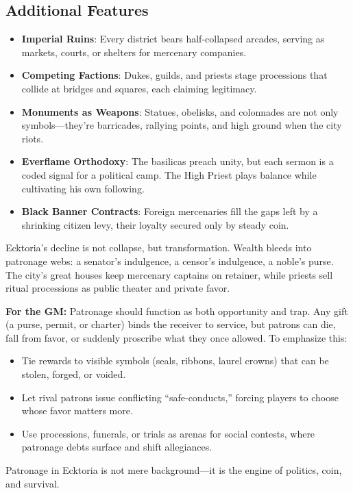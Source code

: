 \subsection*{Additional Features}
\begin{itemize}
\item \textbf{Imperial Ruins}: Every district bears half-collapsed arcades, serving as markets, courts, or shelters for mercenary companies.
\item \textbf{Competing Factions}: Dukes, guilds, and priests stage processions that collide at bridges and squares, each claiming legitimacy.
\item \textbf{Monuments as Weapons}: Statues, obelisks, and colonnades are not only symbols---they're barricades, rallying points, and high ground when the city riots.
\item \textbf{Everflame Orthodoxy}: The basilicas preach unity, but each sermon is a coded signal for a political camp. The High Priest plays balance while cultivating his own following.
\item \textbf{Black Banner Contracts}: Foreign mercenaries fill the gaps left by a shrinking citizen levy, their loyalty secured only by steady coin.
\end{itemize}

\begin{tcolorbox}[colback=black!3,colframe=black!40!white,title={Patronage \& Power}]
Ecktoria's decline is not collapse, but transformation. Wealth bleeds into patronage webs: a senator's indulgence, a censor's indulgence, a noble's purse. The city's great houses keep mercenary captains on retainer, while priests sell ritual processions as public theater and private favor. 

\textbf{For the GM:}  
Patronage should function as both opportunity and trap. Any gift (a purse, permit, or charter) binds the receiver to service, but patrons can die, fall from favor, or suddenly proscribe what they once allowed. To emphasize this:
\begin{itemize}
\item Tie rewards to visible symbols (seals, ribbons, laurel crowns) that can be stolen, forged, or voided.
\item Let rival patrons issue conflicting ``safe-conducts,'' forcing players to choose whose favor matters more.
\item Use processions, funerals, or trials as arenas for social contests, where patronage debts surface and shift allegiances.
\end{itemize}
Patronage in Ecktoria is not mere background---it is the engine of politics, coin, and survival.
\end{tcolorbox}


